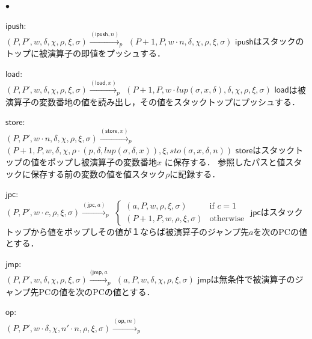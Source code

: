 \documentclass[submit,PRO]{ipsj}
\newcommand{\bcode}[1]{$\mathsf{#1}$}
\begin{document}
\begin{list}{$\bullet$}{}
\item \bcode{ipush}:\\
$(P,P',w,\delta,\chi,\rho,\xi,\sigma)\xrightarrow{(\mathsf{ipush},n)}_p$\newline
\qquad$(P+1,P,w\cdot n,\delta,\chi,\rho,\xi,\sigma)$\newline
\bcode{ipush}はスタックのトップに被演算子の即値をプッシュする．
\item \bcode{load}:\\
$(P,P',w,\delta,\chi,\rho,\xi,\sigma)\xrightarrow{(\mathsf{load},x)}_p$\newline
\qquad$(P+1,P,w\cdot lup(\sigma,x,\delta),\delta,\chi,\rho,\xi,\sigma)$\newline
\bcode{load}は被演算子の変数番地の値を読み出し，その値をスタックトップにプッシュする．
\item \bcode{store}:\\
$(P,P',w\cdot n,\delta,\chi,\rho,\xi,\sigma)\xrightarrow{(\mathsf{store},x)}_p$\newline
\qquad$(P+1,P,w,\delta,\chi,\rho\cdot(p,\delta,lup(\sigma,\delta,x)),\xi,sto(\sigma,x,\delta,n))$\newline
\bcode{store}はスタックトップの値をポップし被演算子の変数番地$x$ に保存する．
参照したパスと値スタックに保存する前の変数の値を値スタック$\rho$に記録する．
\item  \bcode{jpc}:\\
$(P,P',w\cdot c,\rho,\xi,\sigma)\xrightarrow{(\mathsf{jpc},a)}_p$\newline
\qquad\qquad$\begin{cases}
(a,P,w,\rho,\xi,\sigma) & \mbox{if $c=1$}\\
(P+1,P,w,\rho,\xi,\sigma) & \mbox{otherwise}
\end{cases}$
\newline
\bcode{jpc}はスタックトップから値をポップしその値が１ならば被演算子のジャンプ先$a$を次のPCの値とする． 
\item \bcode{jmp}:\\
$(P,P',w,\delta,\chi,\rho,\xi,\sigma)\xrightarrow{(\mathsf{jmp},a}_p$\newline
\qquad$(a,P,w,\delta,\chi,\rho,\xi,\sigma)$\newline
\bcode{jmp}は無条件で被演算子のジャンプ先PCの値を次のPCの値とする．
\item \bcode{op}:\\
$(P,P',w\cdot \delta,\chi,n'\cdot n,\rho,\xi,\sigma)\xrightarrow{(\mathsf{op},m)}_p$\newline

\end{list}
\end{document}
